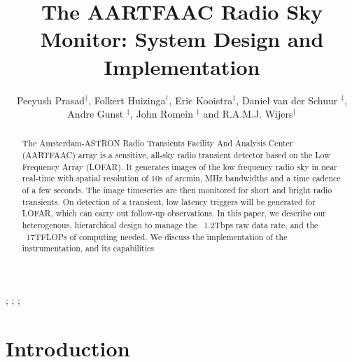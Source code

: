 \documentclass{ws-jai}
\begin{document}
\catchline{}{}{}{}{} %


\title{The AARTFAAC Radio Sky Monitor: System Design and Implementation}

\author{Peeyush Prasad$^\dagger$, Folkert Huizinga$^\dagger$, Eric Kooistra$^\ddagger$, Daniel van der Schuur $^\ddagger$, Andre Gunst $^\ddagger$, John Romein $^\ddagger$ and R.A.M.J. Wijers$^\dagger$}

\address{
$^\dagger$Anton Pannekoek Institute, Universitiet van Amsterdam, Amsterdam, The Netherlands, fauthor@university.com\\
$^\ddagger$ASTRON, Oude Hoogeveensedijk, 7991PD, The Netherlands\\
$^\S$Group, Company, Address, City, State ZIP/Zone, Country, fauthor@company.com
}

\maketitle


\begin{history}
;
;
;
\end{history}

\begin{abstract}
The Amsterdam-ASTRON  Radio Transients  Facility And Analysis  Center (AARTFAAC)
array  is  a sensitive,  all-sky  radio  transient  detector  based on  the  Low
Frequency Array (LOFAR).  It generates images  of the low frequency radio sky in
near real-time  with spatial resolution of  10s of arcmin, MHz  bandwidths and a
time cadence of a few seconds. The image timeseries are then monitored for short
and bright radio  transients. On detection of a transient,  low latency triggers
will be  generated for LOFAR,  which can  carry out follow-up  observations.  In
this  paper, we  describe our  heterogenous, hierarchical  design to  manage the
~1.2Tbps raw  data rate, and the  ~17TFLOPs of computing needed.  We discuss the
implementation of the instrumentation, and its capabilities
\end{abstract}


\section{\label{sec:Introduction}Introduction}
\end{document}

